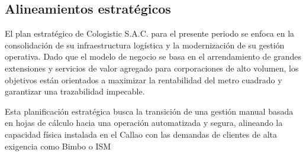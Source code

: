 \documentclass[11pt]{article}
\begin{document}
\subsection{Alineamientos estratégicos}

El plan estratégico de Cologistic S.A.C. para el presente periodo se
enfoca en la consolidación de su infraestructura logística y la
modernización de su gestión operativa. Dado que el modelo de negocio se
basa en el arrendamiento de grandes extensiones y servicios de valor
agregado para corporaciones de alto volumen, los objetivos están
orientados a maximizar la rentabilidad del metro cuadrado y garantizar
una trazabilidad impecable.

Esta planificación estratégica busca la transición de una gestión manual
basada en hojas de cálculo hacia una operación automatizada y segura,
alineando la capacidad física instalada en el Callao con las demandas de
clientes de alta exigencia como Bimbo o ISM
\end{document}
